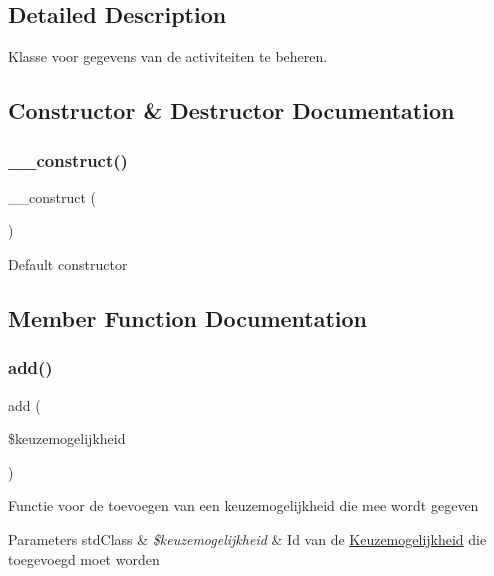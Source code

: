 \subsection{Detailed Description}
Klasse voor gegevens van de activiteiten te beheren. 

\subsection{Constructor \& Destructor Documentation}
\mbox{\label{class_keuzemogelijkheid___model_a095c5d389db211932136b53f25f39685}} 
\subsubsection{\texorpdfstring{\+\_\+\+\_\+construct()}{\_\_construct()}}
{\footnotesize\ttfamily \+\_\+\+\_\+construct (\begin{DoxyParamCaption}{ }\end{DoxyParamCaption})}

Default constructor 

\subsection{Member Function Documentation}
\mbox{\label{class_keuzemogelijkheid___model_ab3ea46c3ea11cbb463eb98238e38c580}} 
\subsubsection{\texorpdfstring{add()}{add()}}
{\footnotesize\ttfamily add (\begin{DoxyParamCaption}\item[{}]{\$keuzemogelijkheid }\end{DoxyParamCaption})}

Functie voor de toevoegen van een keuzemogelijkheid die mee wordt gegeven 
\begin{DoxyParams}[1]{Parameters}
std\+Class & {\em \$keuzemogelijkheid} & Id van de \mbox{\hyperlink{class_keuzemogelijkheid}{Keuzemogelijkheid}} die toegevoegd moet worden \\
\hline
\end{DoxyParams}
\mbox{\label{class_keuzemogelijkheid___model_a2f8258add505482d7f00ea26493a5723}} 
